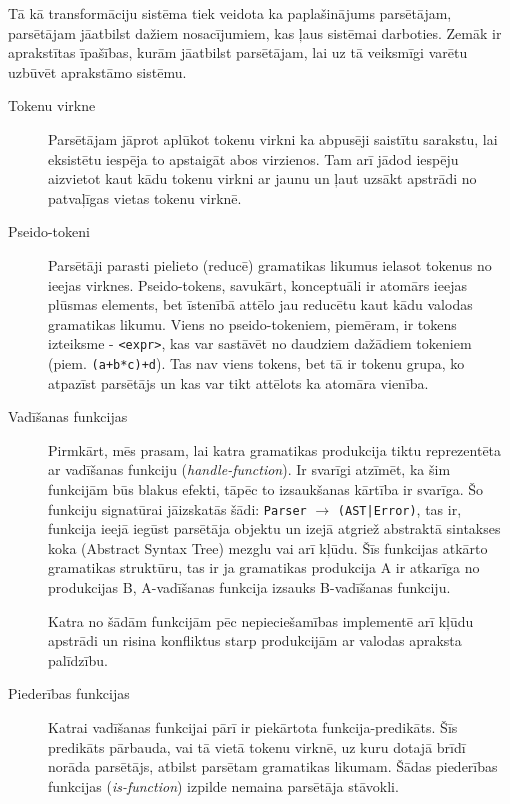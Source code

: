 
Tā kā transformāciju sistēma tiek veidota ka paplašinājums parsētājam, parsētājam jāatbilst dažiem nosacījumiem, kas ļaus sistēmai darboties. Zemāk ir aprakstītas īpašības, kurām jāatbilst parsētājam, lai uz tā veiksmīgi varētu uzbūvēt aprakstāmo sistēmu.
\begin{description}
\item[Tokenu virkne]
Parsētājam jāprot aplūkot tokenu virkni ka abpusēji saistītu sarakstu, lai eksistētu iespēja to apstaigāt abos virzienos. Tam arī jādod iespēju aizvietot kaut kādu tokenu virkni ar jaunu un ļaut uzsākt apstrādi no patvaļīgas vietas tokenu virknē.

\item[Pseido-tokeni]
Parsētāji parasti pielieto (reducē) gramatikas likumus ielasot tokenus no ieejas virknes. Pseido-tokens, savukārt, konceptuāli ir atomārs ieejas plūsmas elements, bet īstenībā attēlo jau reducētu kaut kādu valodas gramatikas likumu. Viens no pseido-tokeniem, piemēram, ir tokens izteiksme - \verb|<expr>|, kas var sastāvēt no daudziem dažādiem tokeniem (piem. \verb|(a+b*c)+d|). Tas nav viens tokens, bet tā ir tokenu grupa, ko atpazīst parsētājs un kas var tikt attēlots ka atomāra vienība.

\item[Vadīšanas funkcijas]
Pirmkārt, mēs prasam, lai katra gramatikas produkcija tiktu reprezentēta ar vadīšanas funkciju (\emph{handle-function}). Ir svarīgi atzīmēt, ka šim funkcijām būs blakus efekti, tāpēc to izsaukšanas kārtība ir svarīga. Šo funkciju signatūrai jāizskatās šādi: \verb|Parser| $\to$ \verb/(AST|Error)/, tas ir, funkcija ieejā iegūst parsētāja objektu un izejā atgriež abstraktā sintakses koka (Abstract Syntax Tree) mezglu vai arī kļūdu. Šīs funkcijas atkārto gramatikas struktūru, tas ir ja gramatikas produkcija A ir atkarīga no produkcijas B, A-vadīšanas funkcija izsauks B-vadīšanas funkciju. 

Katra no šādām funkcijām pēc nepieciešamības implementē arī kļūdu apstrādi un risina konfliktus starp produkcijām ar valodas apraksta palīdzību.

\item[Piederības funkcijas]
Katrai vadīšanas funkcijai pārī ir piekārtota funkcija-predikāts. Šīs predikāts pārbauda, vai tā vietā tokenu virknē, uz kuru dotajā brīdī norāda parsētājs, atbilst parsētam gramatikas likumam. Šādas piederības funkcijas (\emph{is-function}) izpilde nemaina parsētāja stāvokli. 


\end{description}
